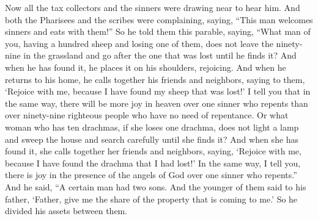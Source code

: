 \begin{biblechapter} %
 Now all the tax collectors and the sinners were drawing near to hear him.
\verse And both the Pharisees and the scribes were complaining, saying, “This man welcomes sinners and eats with them!”
\verse So he told them this parable, saying,
\verse “What man of you, having a hundred sheep and losing one of them, does not leave the ninety-nine in the grassland and go after the one that was lost until he finds it?
\verse And when he has found it, he places it on his shoulders, rejoicing.
\verse And when he returns to his home, he calls together his friends and neighbors, saying to them, ‘Rejoice with me, because I have found my sheep that was lost!’
\verse I tell you that in the same way, there will be more joy in heaven over one sinner who repents than over ninety-nine righteous people who have no need of repentance.
 Or what woman who has ten drachmas, if she loses one drachma, does not light a lamp and sweep the house and search carefully until she finds it?
\verse And when she has found it, she calls together her friends and neighbors, saying, ‘Rejoice with me, because I have found the drachma that I had lost!’
\verse In the same way, I tell you, there is joy in the presence of the angels of God over one sinner who repents.”
 And he said, “A certain man had two sons.
\verse And the younger of them said to his father, ‘Father, give me the share of the property that is coming to me.’ So he divided his assets between them.

\end{biblechapter}
